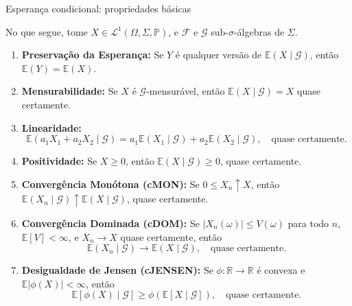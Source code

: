\documentclass[11pt]{beamer}
\begin{document}
	\begin{frame}{Esperança condicional: propriedades básicas}
	
			No que segue, tome $X \in \mathcal{L}^1(\Omega,\Sigma,\mathbb{P})$, e $\mathcal{F}$ e $\mathcal{G}$ sub-$\sigma$-álgebras de $\Sigma$.
	\begin{lemma}
			\begin{enumerate}
			\item \textbf{Preservação da Esperança:}  
			Se \( Y \) é qualquer versão de \( \mathbb{E}(X \mid \mathcal{G}) \), então \( \mathbb{E}(Y) = \mathbb{E}(X) \).
			
			\item \textbf{Mensurabilidade:}  
			Se \( X \) é \( \mathcal{G} \)-mensurável, então \( \mathbb{E}(X \mid \mathcal{G}) = X \) quase certamente.
			
			\item \textbf{Linearidade:}
			\[
			\mathbb{E}(a_1 X_1 + a_2 X_2 \mid \mathcal{G}) = a_1 \mathbb{E}(X_1 \mid \mathcal{G}) + a_2 \mathbb{E}(X_2 \mid \mathcal{G}), \quad \text{quase certamente.}
			\]
			
			\item \textbf{Positividade:}  
			Se \( X \geq 0 \), então \( \mathbb{E}(X \mid \mathcal{G}) \geq 0 \), quase certamente.
			
			\item \textbf{Convergência Monótona (cMON):}  
			Se \( 0 \leq X_n \uparrow X \), então \( \mathbb{E}(X_n \mid \mathcal{G}) \uparrow \mathbb{E}(X \mid \mathcal{G}) \), quase certamente.
			
			\item \textbf{Convergência Dominada (cDOM):}  
			Se \( |X_n(\omega)| \leq V(\omega) \) para todo \( n \), \( \mathbb{E}[V] < \infty \), e \( X_n \to X \) quase certamente, então
			\[
			\mathbb{E}(X_n \mid \mathcal{G}) \to \mathbb{E}(X \mid \mathcal{G}), \quad \text{quase certamente.}
			\]
			
			\item \textbf{Desigualdade de Jensen (cJENSEN):}  
			Se \( \phi: \mathbb{R} \to \mathbb{R} \) é convexa e \( \mathbb{E}|\phi(X)| < \infty \), então
			\[
			\mathbb{E}[\phi(X) \mid \mathcal{G}] \geq \phi(\mathbb{E}[X \mid \mathcal{G}]), \quad \text{quase certamente.}
			\]
		\end{enumerate}
	\end{lemma}
		
				
							
				\end{frame}
	
\end{document}
